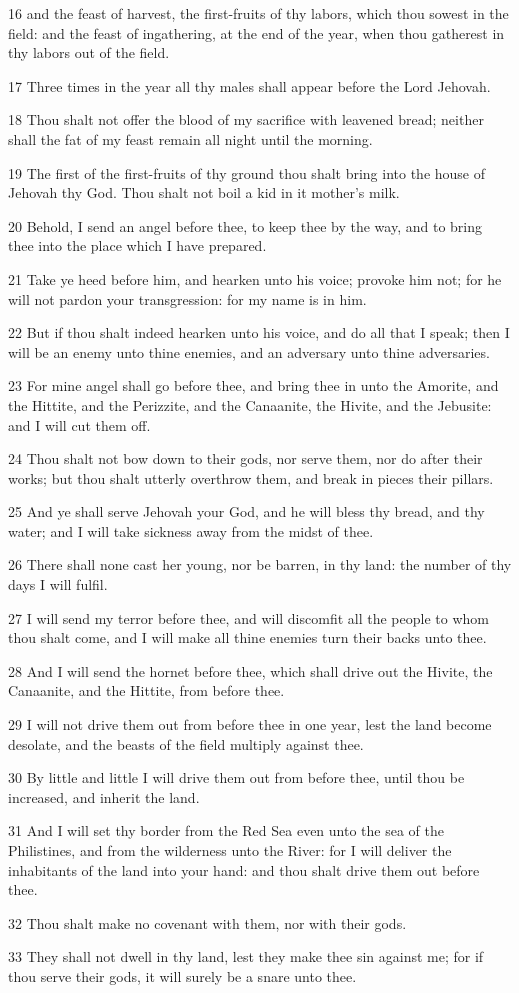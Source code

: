 \par 16 and the feast of harvest, the first-fruits of thy labors, which thou sowest in the field: and the feast of ingathering, at the end of the year, when thou gatherest in thy labors out of the field.
\par 17 Three times in the year all thy males shall appear before the Lord Jehovah.
\par 18 Thou shalt not offer the blood of my sacrifice with leavened bread; neither shall the fat of my feast remain all night until the morning.
\par 19 The first of the first-fruits of thy ground thou shalt bring into the house of Jehovah thy God. Thou shalt not boil a kid in it mother's milk.
\par 20 Behold, I send an angel before thee, to keep thee by the way, and to bring thee into the place which I have prepared.
\par 21 Take ye heed before him, and hearken unto his voice; provoke him not; for he will not pardon your transgression: for my name is in him.
\par 22 But if thou shalt indeed hearken unto his voice, and do all that I speak; then I will be an enemy unto thine enemies, and an adversary unto thine adversaries.
\par 23 For mine angel shall go before thee, and bring thee in unto the Amorite, and the Hittite, and the Perizzite, and the Canaanite, the Hivite, and the Jebusite: and I will cut them off.
\par 24 Thou shalt not bow down to their gods, nor serve them, nor do after their works; but thou shalt utterly overthrow them, and break in pieces their pillars.
\par 25 And ye shall serve Jehovah your God, and he will bless thy bread, and thy water; and I will take sickness away from the midst of thee.
\par 26 There shall none cast her young, nor be barren, in thy land: the number of thy days I will fulfil.
\par 27 I will send my terror before thee, and will discomfit all the people to whom thou shalt come, and I will make all thine enemies turn their backs unto thee.
\par 28 And I will send the hornet before thee, which shall drive out the Hivite, the Canaanite, and the Hittite, from before thee.
\par 29 I will not drive them out from before thee in one year, lest the land become desolate, and the beasts of the field multiply against thee.
\par 30 By little and little I will drive them out from before thee, until thou be increased, and inherit the land.
\par 31 And I will set thy border from the Red Sea even unto the sea of the Philistines, and from the wilderness unto the River: for I will deliver the inhabitants of the land into your hand: and thou shalt drive them out before thee.
\par 32 Thou shalt make no covenant with them, nor with their gods.
\par 33 They shall not dwell in thy land, lest they make thee sin against me; for if thou serve their gods, it will surely be a snare unto thee.

